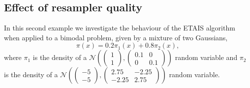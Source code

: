 \documentclass[final]{siamltex}
\begin{document}
\subsection{Effect of resampler quality}
\label{sec:bimodal}
{\red
In this second example we investigate the behaviour of the ETAIS
algorithm when applied to a bimodal problem, given by a mixture of two
Gaussians,
\[\pi(x) = 0.2\pi_1(x) + 0.8\pi_2(x),\]
where $\pi_1$ is the density of a $\mathcal{N}\left (\begin{pmatrix} 1
    \\ 1 \end{pmatrix}, \begin{pmatrix} 0.1 & 0 
    \\ 0 & 0.1 \end{pmatrix} \right )$ random variable and $\pi_2$ is the
  density of a $\mathcal{N}\left (\begin{pmatrix} -5
    \\ -5 \end{pmatrix}, \begin{pmatrix} 2.75 & -2.25 
    \\ -2.25 & 2.75 \end{pmatrix} \right )$ random variable.}
\end{document}
